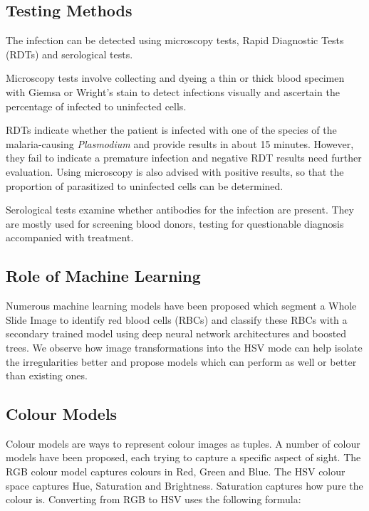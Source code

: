 \documentclass[10pt,twocolumn,letterpaper]{article}
\begin{document}
\subsection{Testing Methods}
The infection can be detected using microscopy tests, Rapid Diagnostic Tests (RDTs) and serological tests.\cite{cdcmalaria}

Microscopy tests involve collecting and dyeing a thin or thick blood specimen with Giemsa or Wright's stain to detect infections visually and ascertain the percentage of infected to uninfected cells.

RDTs indicate whether the patient is infected with one of the species of the malaria-causing \textit{Plasmodium} and provide results in about 15 minutes. However, they fail to indicate a premature infection and negative RDT results need further evaluation. Using microscopy is also advised with positive results, so that the proportion of parasitized to uninfected cells can be determined.

Serological tests examine whether antibodies for the infection are present. They are mostly used for screening blood donors, testing for questionable diagnosis accompanied with treatment.

\subsection{Role of Machine Learning}
Numerous machine learning models have been proposed which segment a Whole Slide Image to identify red blood cells (RBCs) and classify these RBCs with a secondary trained model using deep neural network architectures and boosted trees. We observe how image transformations into the HSV mode can help isolate the irregularities better and propose models which can perform as well or better than existing ones.

\subsection{Colour Models}
Colour models are ways to represent colour images as tuples\cite{enwiki:1091166634}. A number of colour models have been proposed, each trying to capture a specific aspect of sight. The RGB colour model captures colours in Red, Green and Blue. The HSV colour space captures Hue, Saturation and Brightness. Saturation captures how pure the colour is\cite{Kurniastuti_2022}. Converting from RGB to HSV uses the following formula:
\end{document}
